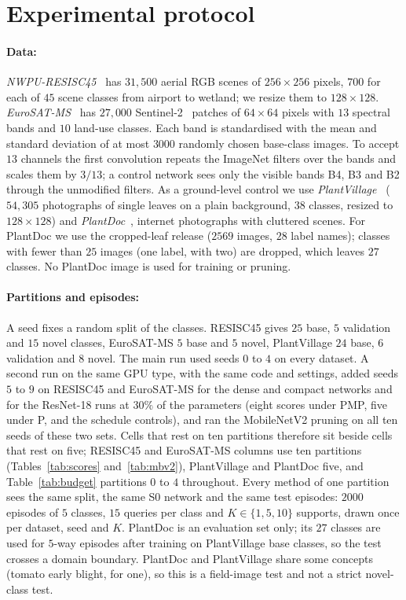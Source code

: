 \section{Experimental protocol}
\label{sec:setup}

\paragraph{Data:}
\emph{NWPU-RESISC45}~\cite{cheng2017resisc} has $31{,}500$ aerial RGB scenes of $256{\times}256$ pixels, $700$ for each of $45$ scene classes from airport to wetland; we resize them to $128{\times}128$. \emph{EuroSAT-MS}~\cite{helber2019eurosat} has $27{,}000$ Sentinel-2~\cite{drusch2012sentinel2} patches of $64{\times}64$ pixels with $13$ spectral bands and $10$ land-use classes. Each band is standardised with the mean and standard deviation of at most $3000$ randomly chosen base-class images. To accept $13$ channels the first convolution repeats the ImageNet filters over the bands and scales them by $3/13$; a control network sees only the visible bands B4, B3 and B2 through the unmodified filters. As a ground-level control we use \emph{PlantVillage}~\cite{hughes2015plantvillage} ($54{,}305$ photographs of single leaves on a plain background, $38$ classes, resized to $128{\times}128$) and \emph{PlantDoc}~\cite{singh2020plantdoc}, internet photographs with cluttered scenes. For PlantDoc we use the cropped-leaf release ($2569$ images, $28$ label names); classes with fewer than $25$ images (one label, with two) are dropped, which leaves $27$ classes. No PlantDoc image is used for training or pruning.

\paragraph{Partitions and episodes:}
A seed fixes a random split of the classes. RESISC45 gives $25$ base, $5$ validation and $15$ novel classes, EuroSAT-MS $5$ base and $5$ novel, PlantVillage $24$ base, $6$ validation and $8$ novel. The main run used seeds $0$ to $4$ on every dataset. A second run on the same GPU type, with the same code and settings, added seeds $5$ to $9$ on RESISC45 and EuroSAT-MS for the dense and compact networks and for the ResNet-18 runs at $30\%$ of the parameters (eight scores under PMP, five under P, and the schedule controls), and ran the MobileNetV2 pruning on all ten seeds of these two sets. Cells that rest on ten partitions therefore sit beside cells that rest on five; RESISC45 and EuroSAT-MS columns use ten partitions (Tables~\ref{tab:scores} and~\ref{tab:mbv2}), PlantVillage and PlantDoc five, and Table~\ref{tab:budget} partitions $0$ to $4$ throughout. Every method of one partition sees the same split, the same S0 network and the same test episodes: $2000$ episodes of $5$ classes, $15$ queries per class and $K\in\{1,5,10\}$ supports, drawn once per dataset, seed and $K$. PlantDoc is an evaluation set only; its $27$ classes are used for $5$-way episodes after training on PlantVillage base classes, so the test crosses a domain boundary. PlantDoc and PlantVillage share some concepts (tomato early blight, for one), so this is a field-image test and not a strict novel-class test.

